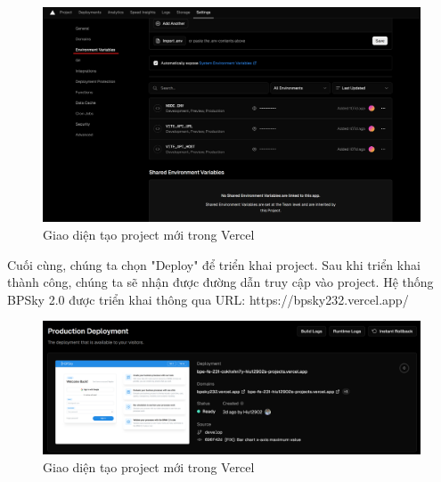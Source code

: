 \begin{figure}[H]
    \centering
    \includegraphics[width=0.7\linewidth]{Content/Hiện thực hệ thống/images/editEnvironmentVariablesVercel.png}
    \vspace{0.5cm}
    \caption{Giao diện tạo project mới trong Vercel}
    \label{fig:Tạo project mới trong Vercel}
\end{figure}

Cuối cùng, chúng ta chọn "Deploy" để triển khai project. Sau khi triển khai thành công, chúng ta sẽ nhận được đường dẫn truy cập vào project. Hệ thống BPSky 2.0 được triển khai thông qua URL: https://bpsky232.vercel.app/

\begin{figure}[H]
    \centering
    \includegraphics[width=0.7\linewidth]{Content/Hiện thực hệ thống/images/deployVercelSuccessful.png}
    \vspace{0.5cm}
    \caption{Giao diện tạo project mới trong Vercel}
    \label{fig:Tạo project mới trong Vercel}
\end{figure}